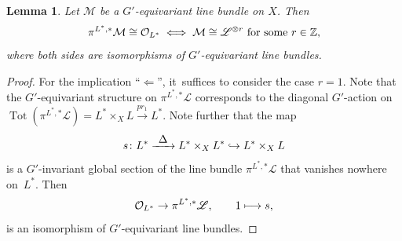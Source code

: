 \documentclass[11pt]{article}
\newcommand\mto{\mathchoice{\longmapsto}{\mapsto}{\mapsto}{\mapsto}}
\newcommand\hto{\mathrel{\lhook\joinrel\to}}
\newcommand{\To}[1]{\mathchoice{\xrightarrow{\textstyle\kern4pt#1\kern3pt}}{\xrightarrow{\,#1\,}}{}{}}
\newtheorem{lem}[thm]{Lemma}
\newcommand{\Ell}{\mathscr{L}}
\DeclareMathOperator{\Tot}{Tot}
\begin{document}
\begin{lem} \label{lem:invariantSection}
Let $\mathcal M$ be a $G'$-equivariant line bundle on $X$. Then
\[
\pi^{L^*,*} \mathcal M \cong \O_{L^*} \iff \mathcal M \cong \Ell^{\otimes r} \text{ for some $r \in \Z$},
\]
where both sides are isomorphisms of $G'$-equivariant line bundles.
\end{lem}

\begin{proof}
For the implication ``$\Leftarrow$'', it~suffices to consider the case $r = 1$. Note that the $G'$-equivariant structure on $\pi^{L^*,*} \Ell$ corresponds to the diagonal $G'$-action on $\Tot(\pi^{L^*,*} \Ell) = L^* \times_X L \xrightarrow{pr_1} L^*$. Note further that the map
\[
s \colon L^* \To{\Delta} L^* \times_X L^* \hto L^* \times_X L
\]
is a $G'$-invariant global section of the line bundle $\pi^{L^*,*} \Ell$ that vanishes nowhere on~$L^*$. Then
\[
\O_{L^*} \to \pi^{L^*,*} \Ell, \qquad 1 \mto s,
\]
is an isomorphism of $G'$-equivariant line bundles.


\end{proof}
\end{document}
